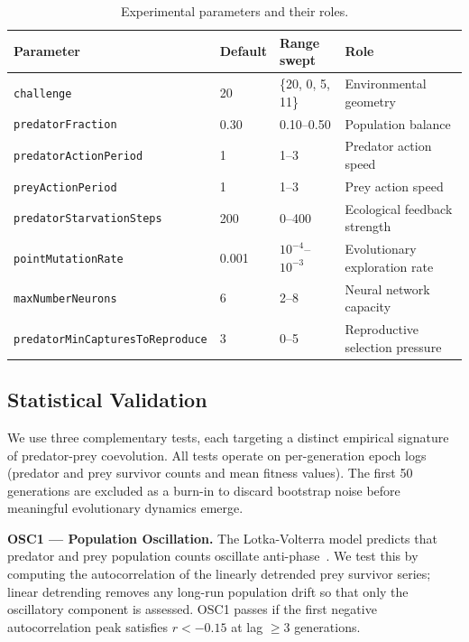 \documentclass[11pt]{article}
\begin{document}
\begin{table}[H]
\centering
\caption{Experimental parameters and their roles.}
\label{tab:params}
\begin{tabular}{llll}
\toprule
Parameter & Default & Range swept & Role \\
\midrule
\texttt{challenge}                       & 20    & \{20, 0, 5, 11\}   & Environmental geometry \\
\texttt{predatorFraction}                & 0.30  & 0.10--0.50         & Population balance \\
\texttt{predatorActionPeriod}            & 1     & 1--3               & Predator action speed \\
\texttt{preyActionPeriod}                & 1     & 1--3               & Prey action speed \\
\texttt{predatorStarvationSteps}         & 200   & 0--400             & Ecological feedback strength \\
\texttt{pointMutationRate}               & 0.001 & $10^{-4}$--$10^{-3}$ & Evolutionary exploration rate \\
\texttt{maxNumberNeurons}                & 6     & 2--8               & Neural network capacity \\
\texttt{predatorMinCapturesToReproduce}  & 3     & 0--5               & Reproductive selection pressure \\
\bottomrule
\end{tabular}
\end{table}

\subsection{Statistical Validation}

We use three complementary tests, each targeting a distinct empirical signature of
predator-prey coevolution.
All tests operate on per-generation epoch logs (predator and prey survivor counts and
mean fitness values).
The first 50 generations are excluded as a burn-in to discard bootstrap noise before
meaningful evolutionary dynamics emerge.

\textbf{OSC1 — Population Oscillation.}
The Lotka-Volterra model predicts that predator and prey population counts oscillate
anti-phase~\cite{lotka1925,volterra1926}.
We test this by computing the autocorrelation of the linearly detrended prey survivor series;
linear detrending removes any long-run population drift so that only the oscillatory component
is assessed.
OSC1 passes if the first negative autocorrelation peak satisfies $r < -0.15$ at lag
$\geq 3$ generations.
\end{document}

